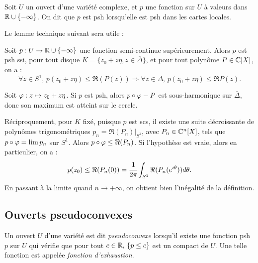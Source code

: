 \begin{defn}
	Soit $U$ un ouvert d'une variété complexe, et $p$ une fonction sur $U$ à valeurs dans $\mathbb{R}\cup \{-\infty \}$. On dit que $p$ est psh lorsqu'elle est psh dans les cartes locales.
\end{defn}

Le lemme technique suivant sera utile :

\begin{lem}
	\label{lem:techpsh} 
	Soit $p : U \to \mathbb{R}\cup \{-\infty \}$ une fonction semi-continue supérieurement. Alors $p$ est psh ssi, pour tout disque $K=\{z_0+z\eta, z\in \overline{\Delta}\}$, et pour tout polynôme $P \in \mathbb{C}[X]$, on a :
	\begin{equation*}
		\forall z \in S^1,\,p(z_0+z\eta)\leq \Re(P(z)) \Rightarrow \forall z\in\Delta,\,p(z_0+z\eta) \leq \Re P(z).
	\end{equation*}
\end{lem}
\begin{preuve}
	Soit $\varphi : z \mapsto z_0+z\eta$. Si $p$ est psh, alors $p\circ \varphi-P$ est sous-harmonique sur $\overline{\Delta}$, donc son maximum est atteint sur le cercle.
	
	Réciproquement, pour $K$ fixé, puisque $p$ est scs, il existe une suite décroissante de polynômes trigonométriques $p_n=\Re(P_n)|_{S^1}$, avec $P_n \in \mathbb{C}^n[X]$, tels que $p \circ \varphi = \lim p_n$ sur $S^1$. Alors $p \circ \varphi \leq \Re(P_n)$. Si l'hypothèse est vraie, alors en particulier, on a :
	\begin{equation*}
		p(z_0) \leq \Re(P_n(0)) =\cfrac{1}{2\pi}\int_{S^1}\Re(P_n(e^{i\theta}))d\theta.
	\end{equation*}
	En passant à la limite quand $n \to +\infty$, on obtient bien l'inégalité de la définition.
\end{preuve}

\subsection{Ouverts pseudoconvexes}
\begin{defn}
	Un ouvert $U$ d'une variété est dit \emph{pseudoconvexe} lorsqu'il existe une fonction psh $p$ sur $U$ qui vérifie que pour tout $c\in \mathbb{R},\,\{p \leq c\}$ est un compact de $U$. Une telle fonction est appelée \emph{fonction d'exhaustion}.
\end{defn}

